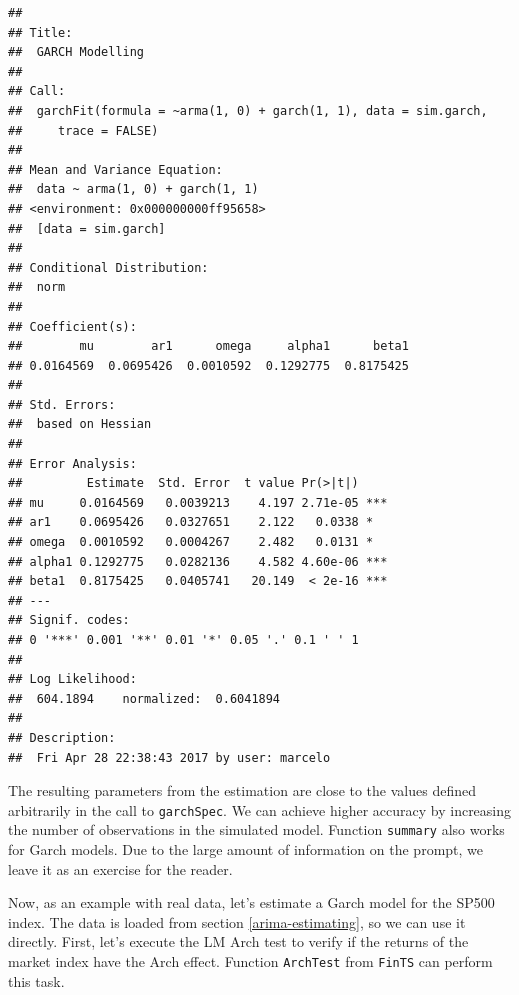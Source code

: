 \documentclass[11pt,]{book}
\newenvironment{Shaded}{\begin{snugshade}}{\end{snugshade}}
\newcommand{\KeywordTok}[1]{\textcolor[rgb]{0.27,0.27,0.27}{\textbf{#1}}}
\newcommand{\DataTypeTok}[1]{\textcolor[rgb]{0.27,0.27,0.27}{#1}}
\newcommand{\DecValTok}[1]{\textcolor[rgb]{0.06,0.06,0.06}{#1}}
\newcommand{\StringTok}[1]{\textcolor[rgb]{0.5,0.5,0.5}{#1}}
\newcommand{\CommentTok}[1]{\textcolor[rgb]{0.56,0.35,0.01}{\textit{#1}}}
\newcommand{\OperatorTok}[1]{\textcolor[rgb]{0.81,0.36,0.00}{\textbf{#1}}}
\newcommand{\NormalTok}[1]{#1}
\begin{document}
\begin{verbatim}
## 
## Title:
##  GARCH Modelling 
## 
## Call:
##  garchFit(formula = ~arma(1, 0) + garch(1, 1), data = sim.garch, 
##     trace = FALSE) 
## 
## Mean and Variance Equation:
##  data ~ arma(1, 0) + garch(1, 1)
## <environment: 0x000000000ff95658>
##  [data = sim.garch]
## 
## Conditional Distribution:
##  norm 
## 
## Coefficient(s):
##        mu        ar1      omega     alpha1      beta1  
## 0.0164569  0.0695426  0.0010592  0.1292775  0.8175425  
## 
## Std. Errors:
##  based on Hessian 
## 
## Error Analysis:
##         Estimate  Std. Error  t value Pr(>|t|)    
## mu     0.0164569   0.0039213    4.197 2.71e-05 ***
## ar1    0.0695426   0.0327651    2.122   0.0338 *  
## omega  0.0010592   0.0004267    2.482   0.0131 *  
## alpha1 0.1292775   0.0282136    4.582 4.60e-06 ***
## beta1  0.8175425   0.0405741   20.149  < 2e-16 ***
## ---
## Signif. codes:  
## 0 '***' 0.001 '**' 0.01 '*' 0.05 '.' 0.1 ' ' 1
## 
## Log Likelihood:
##  604.1894    normalized:  0.6041894 
## 
## Description:
##  Fri Apr 28 22:38:43 2017 by user: marcelo
\end{verbatim}

The resulting parameters from the estimation are close to the values
defined arbitrarily in the call to \texttt{garchSpec}. We can achieve
higher accuracy by increasing the number of observations in the
simulated model. Function \texttt{summary} also works for Garch models.
Due to the large amount of information on the prompt, we leave it as an
exercise for the reader.

Now, as an example with real data, let's estimate a Garch model for the
SP500 index. The data is loaded from section \ref{arima-estimating}, so
we can use it directly. First, let's execute the LM Arch test
\citep{engle1982autoregressive, tsay2005analysis} to verify if the
returns of the market index have the Arch effect. Function
\texttt{ArchTest} from \texttt{FinTS} \citep{fints} can perform this
task.  

\begin{Shaded}
\end{Shaded}
\end{document}
